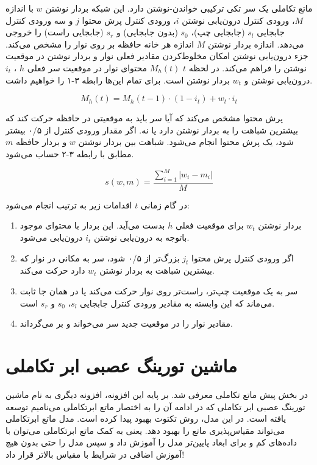 ماتع تکاملی یک سر تکی ترکیبی خواندن-نوشتن دارد. این شبکه بردار نوشتن $w$ با اندازه $M$، ورودی کنترل درون‌یابی نوشتن $i$، ورودی کنترل پرش محتوا $j$ و سه ورودی کنترل جابجایی $s_l$ (جابجایی چپ)، $s_0$ (بدون جابجایی) و $s_r$ (جابجایی راست) را خروجی می‌دهد. اندازه بردار نوشتن $M$ اندازه هر خانه حافظه بر روی نوار را مشخص می‌کند. جزء درون‌یابی نوشتن امکان مخلوط‌کردن مقادیر فعلی نوار و بردار نوشتن در موقعیت نوشتن را فراهم می‌کند. در لحظه $t$ $M_h(t)$ محتوای نوار در موقعیت سر فعلی $h$ ، $i_t$ درون‌یابی نوشتن و $w_t$ بردار نوشتن است. برای تمام این‌ها رابطه ۳-۱ را خواهیم داشت.\cite{merrild2018hyperntm}

\begin{equation}
M_h(t) = M_h(t - 1) · (1 - i_t) + w_t · i_t
\end{equation}

پرش محتوا مشخص می‌کند که آیا سر باید به موقعیتی در حافظه حرکت کند که بیشترین شباهت را به بردار نوشتن دارد یا نه. اگر مقدار ورودی کنترل از ۰/۵ بیشتر شود، یک پرش محتوا انجام می‌شود. شباهت بین بردار نوشتن $w$ و بردار حافظه $m$‌ مطابق با رابطه ۳-۲ حساب می‌شود.\cite{merrild2018hyperntm}

\begin{equation}
s(w, m) = \frac{\sum_{i=1}^{M} |w_i - m_i| }{M} 
\end{equation}

در گام زمانی $t$ اقدامات زیر به ترتیب انجام می‌شود:
\begin{enumerate}
\item بردار نوشتن $w_t$ برای موقعیت فعلی $h$ بدست می‌آید. این بردار با محتوای موجود باتوجه به درون‌یابی نوشتن $i_t$ درون‌یابی می‌شود.
\item اگر ورودی کنترل پرش محتوا $j_t$ بزرگ‌تر از ۰/۵ شود، سر به مکانی در نوار که بیشترین شباهت به بردار نوشتن $w_t$ دارد حرکت می‌کند.
\item سر به یک موقعیت چپ‌تر، راست‌تر روی نوار حرکت می‌کند یا در همان جا ثابت می‌ماند که این وابسته به مقادیر ورودی کنترل جابجایی $s_l$، $s_0$  و $s_r$ است.
\item مقادیر نوار را در موقعیت جدید سر می‌خواند و بر می‌گرداند.\cite{merrild2018hyperntm}
\end{enumerate}

\section{ماشین تورینگ عصبی ابر تکاملی}
در بخش پیش ماتع تکاملی معرفی شد. بر پایه این افزونه، افزونه دیگری به نام ماشین تورینگ عصبی ابر تکاملی که در ادامه آن را به اختصار ماتع ابرتکاملی می‌نامیم توسعه یافته است. در این مدل، روش تکتوت بهبود پیدا کرده است. مدل ماتع ابرتکاملی می‌تواند مقیاس‌پذیری ماتع را بهبود دهد. یعنی به کمک ماتع ابرتکاملی می‌توان با داده‌های کم و برای ابعاد پایین‌تر مدل را آموزش داد و سپس مدل را حتی بدون هیچ آموزش اضافی در شرایط با مقیاس بالاتر قرار داد!\cite{merrild2018hyperntm}


